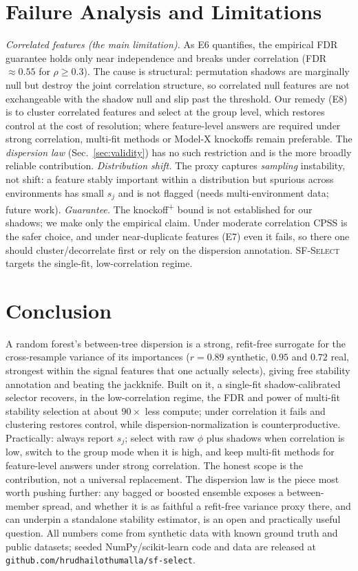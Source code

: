 \documentclass[conference]{IEEEtran}
\begin{document}
\section{Failure Analysis and Limitations}\label{sec:fail}
\emph{Correlated features (the main limitation).} As E6 quantifies, the
empirical FDR guarantee holds only near independence and breaks under
correlation (FDR $\approx0.55$ for $\rho\ge0.3$). The cause is structural:
permutation shadows are marginally null but destroy the joint correlation
structure, so correlated null features are not exchangeable with the shadow
null and slip past the threshold. Our remedy (E8) is to cluster correlated
features and select at the group level, which restores control at the cost of
resolution; where feature-level answers are required under strong correlation,
multi-fit methods or Model-X knockoffs remain preferable. The \emph{dispersion
law} (Sec.~\ref{sec:validity}) has no such restriction and is the more broadly
reliable contribution.
\emph{Distribution shift.} The proxy captures \emph{sampling} instability, not
shift: a feature stably important within a distribution but spurious across
environments has small $s_j$ and is not flagged (needs multi-environment data;
future work). \emph{Guarantee.} The knockoff\textsuperscript{+} bound is not established for our
shadows; we make only the empirical claim. Under moderate correlation CPSS is the
safer choice, and under near-duplicate features (E7) even it fails, so there one
should cluster/decorrelate first or rely on the dispersion annotation.
\textsc{SF-Select} targets the single-fit, low-correlation regime.

\section{Conclusion}
A random forest's between-tree dispersion is a strong, refit-free surrogate for
the cross-resample variance of its importances ($r{=}0.89$ synthetic, $0.95$ and
$0.72$ real, strongest within the signal features that one actually selects),
giving free stability annotation and beating the jackknife. Built on it, a
single-fit shadow-calibrated selector recovers, in the low-correlation regime,
the FDR and power of multi-fit stability selection at about $90\times$ less
compute; under correlation it fails and clustering restores control, while
dispersion-normalization is counterproductive. Practically: always report
$s_j$; select with raw $\phi$ plus shadows when correlation is low, switch to the
group mode when it is high, and keep multi-fit methods for feature-level answers
under strong correlation. The honest scope is the contribution, not a universal
replacement. The dispersion law is the piece most worth pushing further: any
bagged or boosted ensemble exposes a between-member spread, and whether it is as
faithful a refit-free variance proxy there, and can underpin a standalone
stability estimator, is an open and practically useful question. All numbers
come from synthetic data with known ground truth and
public datasets; seeded NumPy/scikit-learn code and data are released at
\texttt{github.com/hrudhailothumalla/sf-select}.
\end{document}
